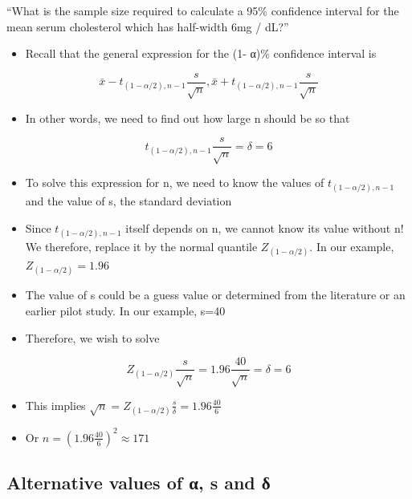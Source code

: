 \documentclass[
]{book}
\providecommand{\tightlist}{%
  \setlength{\itemsep}{0pt}\setlength{\parskip}{0pt}}
\begin{document}
``What is the sample size required to calculate a 95\% confidence interval for the mean serum cholesterol which has half-width 6mg / dL?''

\begin{itemize}
\tightlist
\item
  Recall that the general expression for the (1- α)\% confidence interval is
\end{itemize}

\[\bar x-t_{(1-\alpha/2),n-1}\frac{s}{\sqrt n},\bar x+t_{(1-\alpha/2),n-1}\frac{s}{\sqrt n}\]

\begin{itemize}
\tightlist
\item
  In other words, we need to find out how large n should be so that
\end{itemize}

\[t_{(1-\alpha/2),n-1}\frac{s}{\sqrt n}=\delta=6\]

\begin{itemize}
\tightlist
\item
  To solve this expression for n, we need to know the values of \(t_{(1-\alpha/2),n-1}\) and the value of s, the standard deviation
\item
  Since \(t_{(1-\alpha/2),n-1}\) itself depends on n, we cannot know its value without n! We therefore, replace it by the normal quantile \(Z_{(1-\alpha/2)}\). In our example, \(Z_{(1-\alpha/2)}=1.96\)
\item
  The value of s could be a guess value or determined from the literature or an earlier pilot study. In our example, s=40
\item
  Therefore, we wish to solve
\end{itemize}

\[Z_{(1-\alpha/2)}\frac{s}{\sqrt n}=1.96\frac{40}{\sqrt n}=\delta=6\]

\begin{itemize}
\tightlist
\item
  This implies \(\sqrt n = Z_{(1-\alpha/2)}\frac{s}{\delta}=1.96\frac{40}{6}\)
\item
  Or \(n = (1.96\frac{40}{6})^2 \approx 171\)
\end{itemize}

\hypertarget{alternative-values-of-ux3b1-s-and-ux3b4}{%
\subsection{Alternative values of α, s and δ}\label{alternative-values-of-ux3b1-s-and-ux3b4}}
\end{document}
